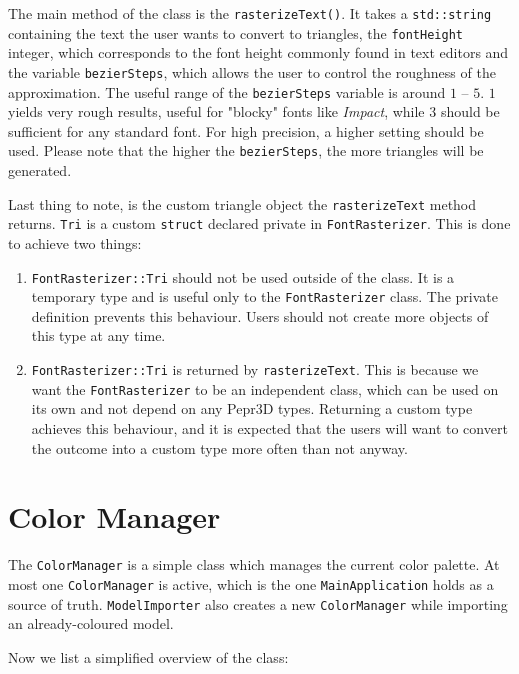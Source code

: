 The main method of the class is the \texttt{rasterizeText()}. It takes a \texttt{std::string} containing the text the user wants to convert to triangles, the \texttt{fontHeight} integer, which corresponds to the font height commonly found in text editors and the variable \texttt{bezierSteps}, which allows the user to control the roughness of the approximation. The useful range of the \texttt{bezierSteps} variable is around $1$ -- $5$. $1$ yields very rough results, useful for "blocky" fonts like \textit{Impact}, while $3$ should be sufficient for any standard font. For high precision, a higher setting should be used. Please note that the higher the \texttt{bezierSteps}, the more triangles will be generated.

Last thing to note, is the custom triangle object the \texttt{rasterizeText} method returns. \texttt{Tri} is a custom \texttt{struct} declared private in \texttt{FontRasterizer}. This is done to achieve two things: 

\begin{enumerate}
\item \texttt{FontRasterizer::Tri} should not be used outside of the class. It is a temporary type and is useful only to the \texttt{FontRasterizer} class. The private definition prevents this behaviour. Users should not create more objects of this type at any time.

\item \texttt{FontRasterizer::Tri} is returned by \texttt{rasterizeText}. This is because we want the \texttt{FontRasterizer} to be an independent class, which can be used on its own and not depend on any Pepr3D types. Returning a custom type achieves this behaviour, and it is expected that the users will want to convert the outcome into a custom type more often than not anyway.
\end{enumerate}

\section{Color Manager}

The \texttt{ColorManager} is a simple class which manages the current color palette. At most one \texttt{ColorManager} is active, which is the one \texttt{MainApplication} holds as a source of truth. \texttt{ModelImporter} also creates a new \texttt{ColorManager} while importing an already-coloured model.

Now we list a simplified overview of the class:

